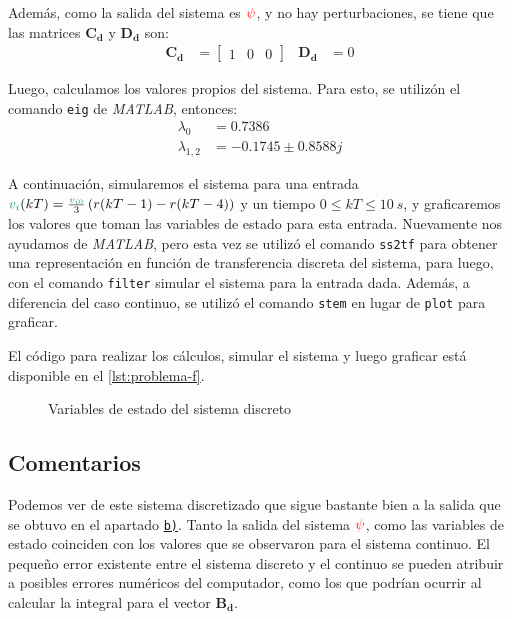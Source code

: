 Además, como la salida del sistema es $\mathbin{\color{red}\psi}$, y no hay perturbaciones,
se tiene que las matrices $\pmb{C_{d}}$ y $\pmb{D_{d}}$ son:
\begin{align}
  \pmb{C_{d}} &= \begin{bmatrix}
      1 & 0 & 0
  \end{bmatrix} &
  \pmb{D_{d}} &= 0
\end{align}

Luego, calculamos los valores propios del sistema. Para esto, se utilizón el
comando \verb|eig| de \textit{MATLAB}, entonces:
\begin{align}
  \lambda_{0} &=  0.7386 \\
  \lambda_{1,2} &=  -0.1745 \pm 0.8588j
\end{align}

A continuación, simularemos el sistema para una entrada
$\verd{v_{i}}(kT) = \frac{\verd{v_{i0}}}{3}\left(r(kT-1) - r(kT-4)\right)$
y un tiempo $0 \leq kT \leq 10\ \unit{s}$, y graficaremos los valores que
toman las variables de estado para esta entrada. Nuevamente nos ayudamos
de \textit{MATLAB}, pero esta vez se utilizó el comando \verb|ss2tf| para
obtener una representación en función de transferencia discreta del sistema,
para luego, con el comando \verb|filter| simular el sistema para la entrada
dada. Además, a diferencia del caso continuo, se utilizó el comando \verb|stem|
en lugar de \verb|plot| para graficar.

El código para realizar los cálculos, simular el sistema y luego graficar está
disponible en el \autoref{lst:problema-f}.

\begin{figure}[h]
  \centering
  
  \caption{Variables de estado del sistema discreto}\label{fig:estado-discreto}
\end{figure}

\FloatBarrier

\subsection{Comentarios}

Podemos ver de este sistema discretizado que sigue bastante bien a la salida que
se obtuvo en el apartado \hyperref[pregunta-b]{\texttt{b)}}. Tanto la salida del
sistema $\mathbin{\color{red}\psi}$, como las variables de estado coinciden con los valores 
que
se observaron para el sistema continuo. El pequeño error existente entre el 
sistema
discreto y el continuo se pueden atribuir a posibles errores numéricos del 
computador,
como los que podrían ocurrir al calcular la integral para el vector $\mathbf{B_
{d}}$.

